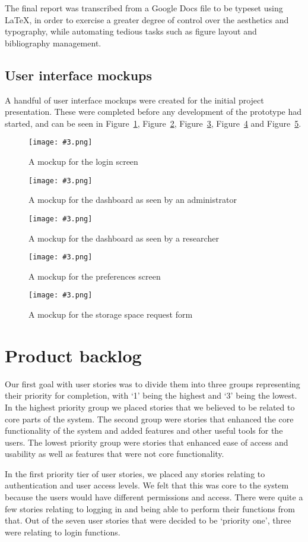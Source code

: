 \documentclass[a4paper,titlepage,12pt]{article}
\let\stdsection\section
\renewcommand\section{\newpage\stdsection}
\newcommand\figimg[4][\textwidth]{
	\begin{figure}
		\caption{#4}
		\label{fig:#2}
		\texttt{[image: \#3.png]}
	\end{figure}
}
\begin{document}
The final report was transcribed from a Google Docs file to be typeset using
\LaTeX, in order to exercise a greater degree of control over the aesthetics
and typography, while automating tedious tasks such as figure layout and
bibliography management.

\newpage

\subsection{User interface mockups}

A handful of user interface mockups were created for the initial project
presentation. These were completed before any development of the prototype had
started, and can be seen in
Figure~\ref{fig:login-mockup},
Figure~\ref{fig:admin-mockup},
Figure~\ref{fig:researcher-mockup},
Figure~\ref{fig:preferences-mockup} and
Figure~\ref{fig:request-mockup}.

\figimg{login-mockup}{../mockups/login}
	{A mockup for the login screen}

\figimg{admin-mockup}{../mockups/admin}
	{A mockup for the dashboard as seen by an administrator}

\figimg{researcher-mockup}{../mockups/researcher}
	{A mockup for the dashboard as seen by a researcher}

\figimg{preferences-mockup}{../mockups/preferences}
	{A mockup for the preferences screen}

\figimg{request-mockup}{../mockups/request}
	{A mockup for the storage space request form}

\section{Product backlog}

Our first goal with user stories was to divide them into three groups
representing their priority for completion, with `1' being the highest and `3'
being the lowest. In the highest priority group we placed stories that we
believed to be related to core parts of the system. The second group were
stories that enhanced the core functionality of the system and added features
and other useful tools for the users. The lowest priority group were stories
that enhanced ease of access and usability as well as features that were not
core functionality.

In the first priority tier of user stories, we placed any stories relating to
authentication and user access levels. We felt that this was core to the system
because the users would have different permissions and access. There were quite
a few stories relating to logging in and being able to perform their functions
from that. Out of the seven user stories that were decided to be `priority
one', three were relating to login functions.
\end{document}

